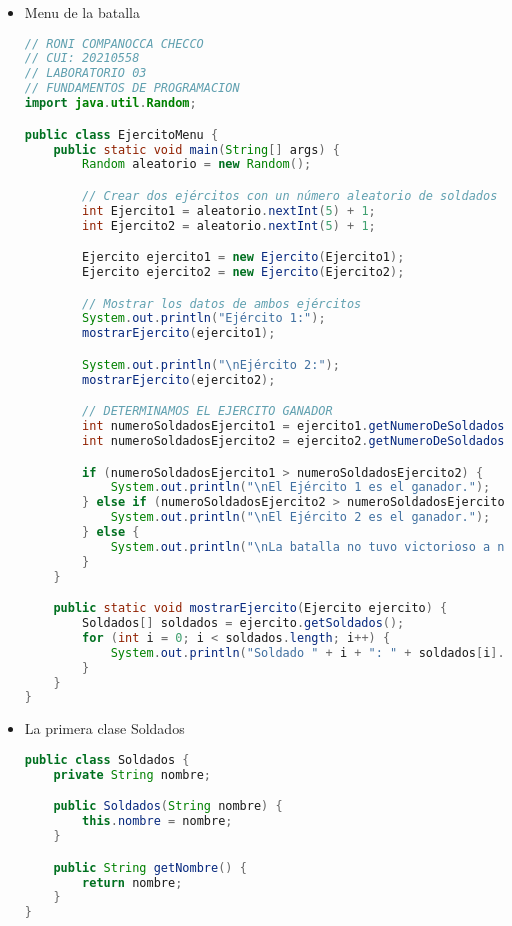 \documentclass{article}
\begin{document}
\begin{itemize}
    \item Menu de la batalla
    \begin{lstlisting}[language=java]
// RONI COMPANOCCA CHECCO
// CUI: 20210558
// LABORATORIO 03
// FUNDAMENTOS DE PROGRAMACION 
import java.util.Random;

public class EjercitoMenu {
    public static void main(String[] args) {
        Random aleatorio = new Random();

        // Crear dos ejércitos con un número aleatorio de soldados entre 1 y 5
        int Ejercito1 = aleatorio.nextInt(5) + 1;
        int Ejercito2 = aleatorio.nextInt(5) + 1;

        Ejercito ejercito1 = new Ejercito(Ejercito1);
        Ejercito ejercito2 = new Ejercito(Ejercito2);

        // Mostrar los datos de ambos ejércitos
        System.out.println("Ejército 1:");
        mostrarEjercito(ejercito1);

        System.out.println("\nEjército 2:");
        mostrarEjercito(ejercito2);

        // DETERMINAMOS EL EJERCITO GANADOR
        int numeroSoldadosEjercito1 = ejercito1.getNumeroDeSoldados();
        int numeroSoldadosEjercito2 = ejercito2.getNumeroDeSoldados();

        if (numeroSoldadosEjercito1 > numeroSoldadosEjercito2) {
            System.out.println("\nEl Ejército 1 es el ganador.");
        } else if (numeroSoldadosEjercito2 > numeroSoldadosEjercito1) {
            System.out.println("\nEl Ejército 2 es el ganador.");
        } else {
            System.out.println("\nLa batalla no tuvo victorioso a ningun ejercito");
        }
    }

    public static void mostrarEjercito(Ejercito ejercito) {
        Soldados[] soldados = ejercito.getSoldados();
        for (int i = 0; i < soldados.length; i++) {
            System.out.println("Soldado " + i + ": " + soldados[i].getNombre());
        }
    }
}
    \end{lstlisting}

    \item La primera clase Soldados
    \begin{lstlisting}[language=java]
public class Soldados {
    private String nombre;

    public Soldados(String nombre) {
        this.nombre = nombre;
    }

    public String getNombre() {
        return nombre;
    }
}
    \end{lstlisting}
    

\end{itemize}
\end{document}
